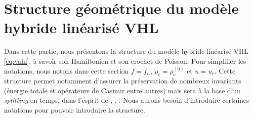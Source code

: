 
\section{Structure géométrique du modèle hybride linéarisé VHL}
\label{s:geom}

Dans cette partie, nous présentons la structure du modèle hybride linéarisé VHL \eqref{eq:vahl}, à savoir son Hamiltonien et son crochet de Poisson. Pour simplifier les notations, nous notons dans cette section $f=f_h$, $\rho_c=\rho_c^{(0)}$ et $u=u_c$. Cette structure permet notamment d'assurer la préservation de nombreux invariants (énergie totale et opérateurs de Casimir entre autres) mais sera à la base d'un \emph{splitting} en temps, dans l'esprit de \cite{Crouseilles:2015}, \cite{Casas:2017}, \cite{Kraus:2017} \cite{Li:2020}. Nous aurons besoin d'introduire certaines notations pour pouvoir introduire la structure.

